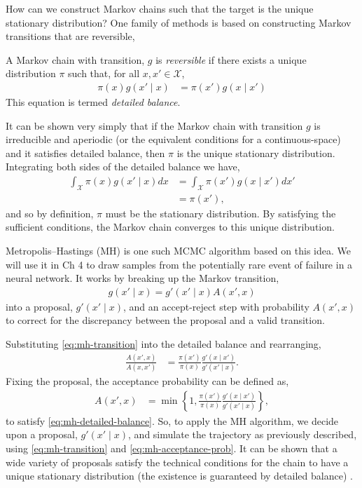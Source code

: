 How can we construct Markov chains such that the target is the unique stationary distribution? One family of methods is based on constructing Markov transitions that are reversible,
\begin{definition}
	A Markov chain with transition, $g$ is \emph{reversible} if there exists a unique distribution $\pi$ such that, for all $x,x'\in\mathcal{X}$,
	\begin{align*}
		\pi(x)g(x'\mid x) &= \pi(x')g(x\mid x')
	\end{align*}
	This equation is termed \emph{detailed balance}.
\end{definition}
It can be shown very simply that if the Markov chain with transition $g$ is irreducible and aperiodic (or the equivalent conditions for a continuous-space) and it satisfies detailed balance, then $\pi$ is the unique stationary distribution. Integrating both sides of the detailed balance we have,
\begin{align*}
	\int_\mathcal{X}\pi(x)g(x'\mid x)dx &= \int_\mathcal{X}\pi(x')g(x\mid x')dx'\\
	&= \pi(x'),
\end{align*}
and so by definition, $\pi$ must be the stationary distribution. By satisfying the sufficient conditions, the Markov chain converges to this unique distribution.

Metropolis--Hastings (MH) \citep{gilks1995markov} is one such MCMC algorithm based on this idea. We will use it in Ch 4 to draw samples from the potentially rare event of failure in a neural network. It works by breaking up the Markov transition,
\begin{align}\label{eq:mh-transition}
	g(x'\mid x)=g'(x'\mid x)A(x',x)
\end{align}
into a proposal, $g'(x'\mid x)$, and an accept-reject step with probability $A(x',x)$ to correct for the discrepancy between the proposal and a valid transition.

Substituting \eqref{eq:mh-transition} into the detailed balance and rearranging,
\begin{align}\label{eq:mh-detailed-balance}
	\frac{A(x',x)}{A(x,x')} &= \frac{\pi(x')}{\pi(x)}\frac{g'(x\mid x')}{g'(x'\mid x)}.
\end{align}
Fixing the proposal, the acceptance probability can be defined as,
\begin{align}\label{eq:mh-acceptance-prob}
	A(x',x) &= \min\left\{1, \frac{\pi(x')}{\pi(x)}\frac{g'(x\mid x')}{g'(x'\mid x)}\right\},
\end{align}
to satisfy \eqref{eq:mh-detailed-balance}. So, to apply the MH algorithm, we decide upon a proposal, $g'(x'\mid x)$, and simulate the trajectory as previously described, using \eqref{eq:mh-transition} and \eqref{eq:mh-acceptance-prob}. It can be shown that a wide variety of proposals satisfy the technical conditions for the chain to have a unique stationary distribution (the existence is guaranteed by detailed balance) \citep{andrieu2003introduction}.

